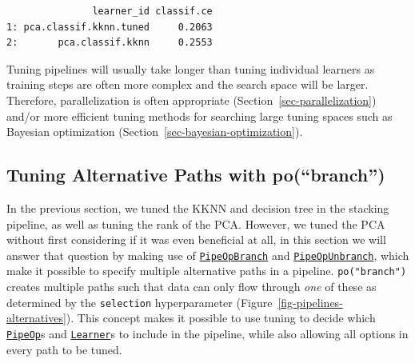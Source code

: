 \begin{Shaded}
\begin{Highlighting}[]
\OtherTok{=} \NormalTok{(}\NormalTok{(}
  \NormalTok{(}\NormalTok{), } \NormalTok{)}
\OtherTok{=} \NormalTok{(}\NormalTok{) }\SpecialCharTok{\%\textgreater{}\textgreater{}\%} \NormalTok{(}\NormalTok{)}
\OtherTok{=} \NormalTok{(}\NormalTok{(}\NormalTok{), }
  \NormalTok{(}\NormalTok{, } \NormalTok{))}
\SpecialCharTok{$}
\end{Highlighting}
\end{Shaded}

\begin{verbatim}
               learner_id classif.ce
1: pca.classif.kknn.tuned     0.2063
2:       pca.classif.kknn     0.2553
\end{verbatim}

Tuning pipelines will usually take longer than tuning individual
learners as training steps are often more complex and the search space
will be larger. Therefore, parallelization is often appropriate
(Section~\ref{sec-parallelization}) and/or more efficient tuning methods
for searching large tuning spaces such as Bayesian
optimization
(Section~\ref{sec-bayesian-optimization}).

\hypertarget{sec-pipelines-branch}{%
\subsection{Tuning Alternative Paths with
po(``branch'')}\label{sec-pipelines-branch}}

In the previous section, we tuned the KKNN and decision
tree in the stacking pipeline, as well as tuning
the rank of the PCA. However, we tuned the PCA without first considering
if it was even beneficial at all, in this section we will answer that
question by making use of
\href{https://mlr3pipelines.mlr-org.com/reference/mlr_pipeops_branch.html}{\texttt{PipeOpBranch}}
and
\href{https://mlr3pipelines.mlr-org.com/reference/mlr_pipeops_unbranch.html}{\texttt{PipeOpUnbranch}},
which make it possible to specify multiple alternative paths in a
pipeline. \texttt{po("branch")} creates multiple paths such that data
can only flow through \emph{one} of these as determined by the
\texttt{selection} hyperparameter
(Figure~\ref{fig-pipelines-alternatives}). This concept makes it
possible to use tuning to decide which
\href{https://mlr3pipelines.mlr-org.com/reference/PipeOp.html}{\texttt{PipeOp}}s
and
\href{https://mlr3.mlr-org.com/reference/Learner.html}{\texttt{Learner}}s
to include in the pipeline, while also allowing all options in every
path to be tuned.

